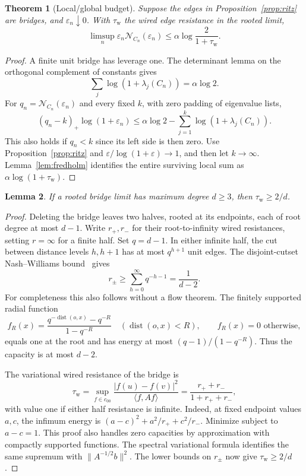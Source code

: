 \documentclass[11pt]{article}
\newtheorem{theorem}{Theorem}[section]
\newtheorem{lemma}[theorem]{Lemma}
\newcommand{\N}{\mathcal N}
\begin{document}
\begin{theorem}[Local/global budget]\label{thm:budget}
Suppose the edges in Proposition~\ref{prop:ritz} are bridges, and
$\varepsilon_n\downarrow0$. With $\tau_{\mathrm w}$ the wired edge
resistance in the rooted limit,
\begin{equation}\label{eq:budget}
 \limsup_n\varepsilon_n\N_{C_n}(\varepsilon_n)
                \le\alpha\log\frac{2}{1+\tau_{\mathrm w}}.
\end{equation}
\end{theorem}
\begin{proof}
A finite unit bridge has leverage one. The determinant lemma on the
orthogonal complement of constants gives
\[
             \sum_j\log(1+\lambda_j(C_n))=\alpha\log2.
\]
For $q_n=\N_{C_n}(\varepsilon_n)$ and every fixed $k$, with zero
padding of eigenvalue lists,
\[
 (q_n-k)_+\log(1+\varepsilon_n)
    \le\alpha\log2-\sum_{j=1}^k\log(1+\lambda_j(C_n)).
\]
This also holds if $q_n<k$ since its left side is then zero.
Use Proposition~\ref{prop:ritz} and
$\varepsilon/\log(1+\varepsilon)\to1$, and then let $k\to\infty$.
Lemma~\ref{lem:fredholm} identifies the entire surviving local sum as
$\alpha\log(1+\tau_{\mathrm w})$.
\end{proof}

\begin{lemma}\label{lem:resistance}
If a rooted bridge limit has maximum degree $d\ge3$, then
$\tau_{\mathrm w}\ge2/d$.
\end{lemma}
\begin{proof}
Deleting the bridge leaves two halves, rooted at its endpoints, each
of root degree at most $d-1$. Write $r_+,r_-$ for their root-to-infinity
wired resistances, setting $r=\infty$ for a finite half.
Set $q=d-1$. In either infinite half, the cut between distance levels
$h,h+1$ has at most $q^{h+1}$ unit edges. The disjoint-cutset
Nash--Williams bound~\cite[Section 2.5]{LyonsPeres} gives
\[
                 r_\pm\ge\sum_{h=0}^\infty q^{-h-1}
                                =\frac1{d-2}.
\]
For completeness this also follows without a flow theorem. The
finitely supported radial function
\[
 f_R(x)=\frac{q^{-\operatorname{dist}(o,x)}-q^{-R}}{1-q^{-R}}
   \quad(\operatorname{dist}(o,x)<R),\qquad f_R(x)=0\text{ otherwise},
\]
equals one at the root and has energy at most
$(q-1)/(1-q^{-R})$. Thus the capacity is at most $d-2$.

The variational wired resistance of the bridge is
\[
 \tau_{\mathrm w}
 =\sup_{f\in c_{00}}\frac{|f(u)-f(v)|^2}{\langle f,Af\rangle}
 =\frac{r_++r_-}{1+r_++r_-},
\]
with value one if either half resistance is infinite. Indeed, at
fixed endpoint values $a,c$, the infimum energy is
$(a-c)^2+a^2/r_++c^2/r_-$. Minimize subject to $a-c=1$.
This proof also handles zero capacities by approximation with compactly
supported functions. The spectral variational formula identifies the
same supremum with $\|A^{-1/2}b\|^2$. The lower bounds on $r_\pm$
now give $\tau_{\mathrm w}\ge2/d$.
\end{proof}
\end{document}
